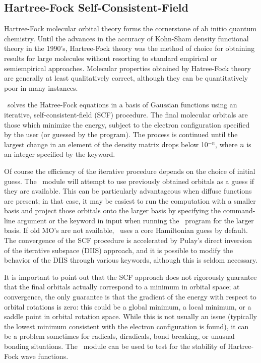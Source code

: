 \subsection{Hartree-Fock Self-Consistent-Field} \label{scf}
                                                                                
Hartree-Fock molecular orbital theory forms the cornerstone of
ab initio quantum chemistry.  Until the advances in the accuracy
of Kohn-Sham density functional theory in the 1990's, Hartree-Fock
theory was the method of choice for obtaining results for large
molecules without resorting to standard empirical or semiempirical
approaches.  Molecular properties obtained by Hatree-Fock theory are
generally at least qualitatively correct, although they can be
quantitatively poor in many instances.
                                                                                
\PSIthree\ solves the Hatree-Fock equations in a basis of Gaussian 
functions using an iterative, self-consistent-field (SCF) procedure.  The
final molecular orbitals are those which minimize the energy, 
subject to the electron configuration specified by the user (or
guessed by the program).  The process is continued until the largest
change in an element of the density matrix drops below 10$^{-n}$, where
$n$ is an integer specified by the  keyword.

Of course the efficiency of the iterative procedure depends on the choice of
initial guess.  The \PSIcscf\ module will attempt to use previously obtained
orbitals as a guess if they are available.  This can be particularly
advantageous when diffuse functions are present; in that case, it may
be easiest to run the computation with a smaller basis and project
those orbitals onto the larger basis by specifying the 
command-line argument or the  keyword in input
when running the \PSIinput\ program for the larger basis.  If
old MO's are not available, \PSIcscf\ uses a core Hamiltonian guess
by default.  The convergence of the SCF procedure is accelerated by Pulay's 
direct inversion of the iterative subspace (DIIS) approach, and it is possible
to modify the behavior of the DIIS through various keywords, 
although this is seldom necessary.  

It is important to point out that the
SCF approach does not rigorously guarantee that the final orbitals
actually correspond to a minimum in orbital space; at convergence,
the only guarantee is that the gradient of the energy with respect 
to orbital rotations is zero: this could be a global minimum, a local
minimum, or a saddle point in orbital rotation space.  While this
is not usually an issue (typically the lowest minimum consistent with 
the electron configuration is found), it can be a problem sometimes for 
radicals, diradicals, bond breaking, or unusual bonding situations.  The
\PSIstable\ module can be used to test for the stability of Hartree-Fock
wave functions.

